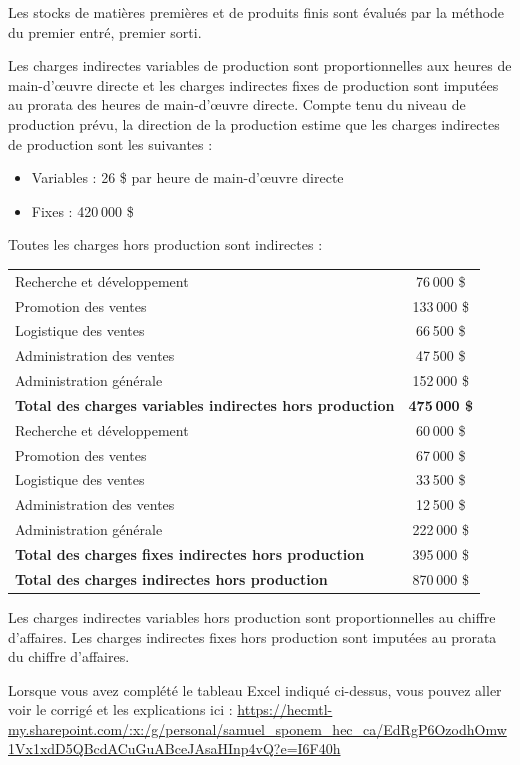 \documentclass[oneside]{kaobook}
\begin{document}
Les stocks de matières premières et de produits finis sont évalués par la méthode du premier entré, premier sorti.

Les charges indirectes variables de production sont proportionnelles aux heures de main-d’œuvre directe et les charges indirectes fixes de production sont imputées au prorata des heures de main-d’œuvre directe. Compte tenu du niveau de production prévu, la direction de la production estime que les charges indirectes de production sont les suivantes :
\begin{itemize}
\item Variables : 26 \$ par heure de main-d’œuvre directe
\item Fixes : 420 000 \$
\end{itemize}

Toutes les charges hors production sont indirectes :
\begin{center}
\sidenotesize
\begin{tabular}{l c}
Recherche et développement & 76 000 \$\\
Promotion des ventes & 133 000 \$\\
Logistique des ventes & 66 500 \$\\
Administration des ventes & 47 500 \$\\
Administration générale & 152 000 \$\\
\textbf{Total des charges variables indirectes hors production} & \textbf{475 000 \$}\\
Recherche et développement & 60 000 \$\\
Promotion des ventes & 67 000 \$\\
Logistique des ventes & 33 500 \$\\
Administration des ventes & 12 500 \$\\
Administration générale & 222 000 \$\\
\textbf{Total des charges fixes indirectes hors production} & 395 000 \$\\
\textbf{Total des charges indirectes hors production} & 870 000 \$\\
\end{tabular}
\end{center}
Les charges indirectes variables hors production sont proportionnelles au chiffre d’affaires. Les charges indirectes fixes hors production sont imputées au prorata du chiffre d’affaires.

\begin{kaobox}
Lorsque vous avez complété le tableau Excel indiqué ci-dessus, vous pouvez aller voir le corrigé et les explications ici : \url{https://hecmtl-my.sharepoint.com/:x:/g/personal/samuel\_sponem\_hec\_ca/EdRgP6OzodhOmw1Vx1xdD5QBcdACuGuABceJAsaHInp4vQ?e=I6F40h}
\end{kaobox}
\end{document}
